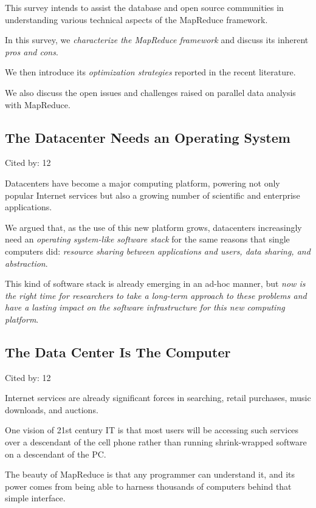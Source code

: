 \documentclass[a4paper,11pt]{article}
\begin{document}
{{{This survey \cite{mapredsurvey}
intends to assist 
the database and open source communities 
in understanding various technical aspects of the MapReduce framework.

In this survey, we 
{\em characterize the MapReduce framework} and 
discuss its inherent 
{\em pros and cons}. 

We then introduce its 
{\em optimization strategies} 
reported in the recent literature.

We also discuss the 
open issues and challenges 
raised on 
parallel data analysis with MapReduce.	

}


\subsection*{The Datacenter Needs an Operating System \cite{dcos}}
{\color{cyan} {\color{magenta} Cited by: 12}

Datacenters have become a major computing platform,
powering not only popular Internet services but also a growing number of scientific and enterprise applications.

We argued that, 
as the use of this new platform grows,
datacenters increasingly need an 
{\em operating system-like software stack}
for the same reasons that single computers did: 
{\em resource sharing between applications and users, data sharing, and abstraction}. 

This kind of software stack is already emerging in an ad-hoc manner, 
but 
{\color{red} \em now is the right time for researchers to take a long-term approach to these problems and 
have a lasting impact on the software infrastructure for this new computing platform}.	

}

\subsection*{The Data Center Is The Computer \cite{dccomputer}}
{\color{cyan} {\color{magenta} Cited by: 12}

Internet services 
are already significant forces in 
searching, retail purchases, music downloads, and auctions. 

One vision of 21st century IT is that 
most users will be accessing such services over a descendant of the cell phone 
rather than running shrink-wrapped software on a descendant of the PC.

The beauty of MapReduce is that any programmer can understand it, and 
its power comes from being able to harness thousands of computers behind that simple interface. 

}}}
\end{document}
